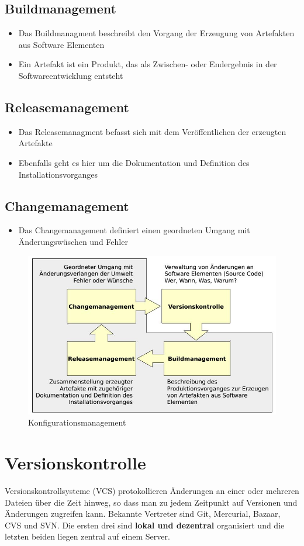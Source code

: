 \subsection{Buildmanagement}
\begin{itemize}
	\item Das Buildmanagment beschreibt den Vorgang der Erzeugung von Artefakten aus Software Elementen
	\item Ein Artefakt ist ein Produkt, das als Zwischen- oder Endergebnis in der Softwareentwicklung entsteht
\end{itemize}

\subsection{Releasemanagement}
\begin{itemize}
	\item Das Releasemanagment befasst sich mit dem Veröffentlichen der erzeugten Artefakte
	\item Ebenfalls geht es hier um die Dokumentation und Definition des Installationsvorganges
\end{itemize}

\subsection{Changemanagement}
\begin{itemize}
	\item Das Changemanagement definiert einen geordneten Umgang mit Änderungswüschen und Fehler
\end{itemize}
\begin{figure}[h]
	\centering
	\includegraphics[width=0.7\linewidth]{images/konfigurationsmanagment}
	\caption{Konfigurationsmanagement}
	\label{fig:konfigurationsmanagment}
\end{figure}


\section{Versionskontrolle}
Versionskontrollsysteme (VCS) protokollieren Änderungen an einer oder mehreren Dateien über die Zeit hinweg, so dass man zu jedem Zeitpunkt auf Versionen und Änderungen zugreifen kann. Bekannte Vertreter sind Git, Mercurial, Bazaar, CVS und SVN. Die ersten drei sind \textbf{lokal und dezentral} organisiert und die letzten beiden liegen zentral auf einem Server.

